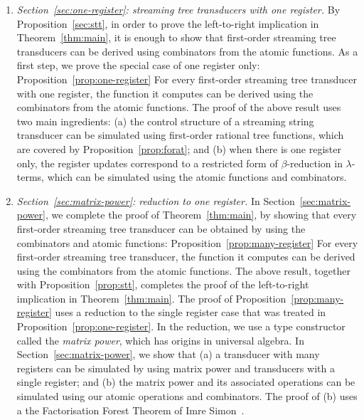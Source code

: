 \begin{enumerate}
     \item \emph{Section~\ref{sec:one-register}: streaming tree transducers with one register.} By Proposition~\ref{sec:stt}, in order to prove the left-to-right implication in Theorem~\ref{thm:main}, it is enough to show that first-order streaming tree transducers can be derived using combinators from the atomic functions. As a first step, we prove the special case of one register only:
     \announce
    {Proposition~\ref{prop:one-register}}
    {For every first-order streaming tree transducer with one register, the function it computes can be derived using the combinators from the atomic functions.}
    The proof of the above result uses two main ingredients: (a) the control structure of a streaming string transducer can be simulated using first-order rational tree functions, which are covered by Proposition~\ref{prop:forat}; and (b) when there is one register only, the register updates correspond to a restricted form of $\beta$-reduction in $\lambda$-terms, which can be simulated using the atomic functions and combinators.  
    \item \emph{Section~\ref{sec:matrix-power}: reduction to one register.}  In Section~\ref{sec:matrix-power}, we complete the proof of Theorem~\ref{thm:main}, by showing that every first-order streaming tree transducer can be obtained by using the combinators and atomic functions:
    \announce
    {Proposition~\ref{prop:many-register}}
    {For every first-order streaming tree transducer, the function it computes can be derived using the combinators from the atomic functions.}
    The above result, together with Proposition~\ref{prop:stt}, completes the proof of the left-to-right implication in Theorem~\ref{thm:main}. The proof of Proposition~\ref{prop:many-register} uses a reduction to the single register case that was treated in Proposition~\ref{prop:one-register}. In the reduction, we use a type constructor called the \emph{matrix power}, which has origins in universal algebra. In Section~\ref{sec:matrix-power}, we show that (a) a transducer with many registers can be simulated by using matrix power and transducers with a single register; and (b) the matrix power and its associated operations can be simulated using our atomic operations and combinators. The proof of (b) uses a the Factorisation Forest Theorem of Imre Simon~\cite{simon_factorization_1990}.
\end{enumerate}
